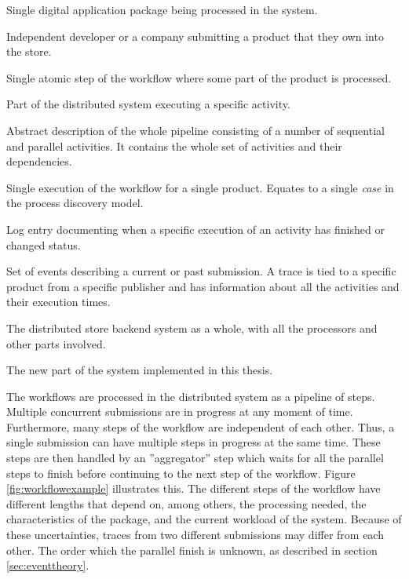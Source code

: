 \begin{description}[style=nextline]
\item[Product] 
Single digital application package being processed in the system. 

\item[Publisher] 
Independent developer or a company submitting a product that they own into the store.

\item[Activity] 
Single atomic step of the workflow where some part of the product is processed. 

\item[Processor] 
Part of the distributed system executing a specific activity.

\item[Workflow]
Abstract description of the whole pipeline consisting of a number of sequential and parallel activities. It contains the whole set of activities and their dependencies.

\item[Submission] 
Single execution of the workflow for a single product. Equates to a single \emph{case} in the process discovery model.

\item[Event] 
Log entry documenting when a specific execution of an activity has finished or changed status. 

\item[Trace] 
Set of events describing a current or past submission. 
A trace is tied to a specific product from a specific publisher and has information about all the activities and their execution times. 

\item[System] 
The distributed store backend system as a whole, with all the processors and other parts involved.

\item[Project] 
The new part of the system implemented in this thesis.

\label{desc:termdefinitions}
\end{description}


The workflows are processed in the distributed system as a pipeline of steps. 
Multiple concurrent submissions are in progress at any moment of time.
Furthermore, many steps of the workflow are independent of each other.
Thus, a single submission can have multiple steps in progress at the same time.
These steps are then handled by an ''aggregator'' step which waits for 
all the parallel steps to finish before continuing to the next step of the workflow.
Figure \ref{fig:workflowexample} illustrates this.
The different steps of the workflow have different lengths that depend on, among others,
the processing needed, the characteristics of the package, and the current workload of the system.
Because of these uncertainties, traces from two different submissions may differ from each other.
The order which the parallel finish is unknown, as described in section \ref{sec:eventtheory}.

